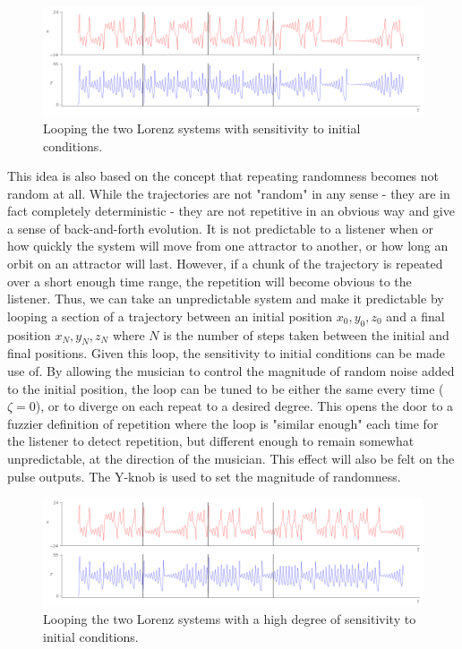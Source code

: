 \documentclass{tufte-handout}
\begin{document}
\begin{figure}[h]
  \includegraphics[width=\linewidth]{dependent_loop.png}%
  \caption{Looping the two Lorenz systems with sensitivity to initial conditions.}%
  \label{fig:dependent_loop}%
\end{figure}


This idea is also based on the concept that repeating randomness becomes not random at all. While the trajectories are not "random" in any sense - they are in fact completely deterministic - they are not repetitive in an obvious way and give a sense of back-and-forth evolution. It is not predictable to a listener when or how quickly the system will move from one attractor to another, or how long an orbit on an attractor will last. However, if a chunk of the trajectory is repeated over a short enough time range, the repetition will become obvious to the listener. Thus, we can take an unpredictable system and make it predictable by looping a section of a trajectory between an initial position $x_0, y_0, z_0$ and a final position $x_N, y_N, z_N$ where $N$ is the number of steps taken between the initial and final positions. Given this loop, the sensitivity to initial conditions can be made use of. By allowing the musician to control the magnitude of random noise added to the initial position, the loop can be tuned to be either the same every time ($\zeta=0$), or to diverge on each repeat to a desired degree. This opens the door to a fuzzier definition of repetition where the loop is "similar enough" each time for the listener to detect repetition, but different enough to remain somewhat unpredictable, at the direction of the musician. This effect will also be felt on the pulse outputs. The Y-knob is used to set the magnitude of randomness.

\begin{figure}[h]
  \includegraphics[width=\linewidth]{very_dependent_loop.png}%
  \caption{Looping the two Lorenz systems with a high degree of sensitivity to initial conditions.}%
  \label{fig:very_dependent_loop}%
\end{figure}
\end{document}
